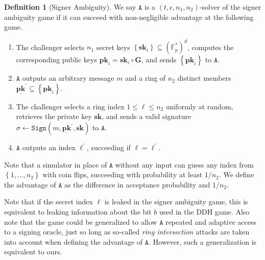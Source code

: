 \documentclass{mrl}
\theoremstyle{plain}
\theoremstyle{definition}
\newtheorem{definition}{Definition}[section]
\begin{document}
\begin{definition}[Signer Ambiguity]\label{sigambgame} We say $\texttt{A}$ is a $(t,\epsilon,n_1,n_2)$-solver of the signer ambiguity game if it can succeed with non-negligible advantage at the following game.
\begin{enumerate}
\item The challenger selects $n_1$ secret keys $\left\{\textbf{sk}_i\right\} \subseteq (\mathbb{F}_p^*)^d$, computes the corresponding public keys $\textbf{pk}_i = \textbf{sk}_i \circ \textbf{G}$, and sends $\left\{\textbf{pk}_i\right\}$ to $\texttt{A}$.

\item $\texttt{A}$ outputs an arbitrary message $m$ and a ring of $n_2$ distinct members $\underline{\textbf{pk}}^\prime \subseteq \left\{\textbf{pk}_i\right\}$.

\item The challenger selects a ring index $1 \leq \ell \leq n_2$ uniformly at random, retrieves the private key $\textbf{sk}$, and sends a valid signature $\sigma \leftarrow \texttt{Sign}(m, \underline{\textbf{pk}}^\prime, \textbf{sk})$ to $\texttt{A}$.
\item $\texttt{A}$ outputs an index $\ell^\prime$, succeeding if $\ell = \ell^\prime$. 
\end{enumerate}
Note that a simulator in place of $\texttt{A}$ without any input can guess any index from $\left\{1, \ldots, n_2\right\}$ with coin flips, succeeding with probability  at least $1/n_2$. We define the advantage of $\texttt{A}$ as the difference in acceptance probability and $1/n_2$.
\end{definition}

Note that if the secret index $\ell$ is leaked in the signer ambiguity game, this is equivalent to leaking information about the bit $b$ used in the DDH game. Also note that the game could be generalized to allow $\texttt{A}$ repeated and adaptive access to a signing oracle, just so long as so-called \textit{ring intersection} attacks are taken into account when defining the advantage of $\texttt{A}$. However, such a generalization is equivalent to ours.
\end{document}
